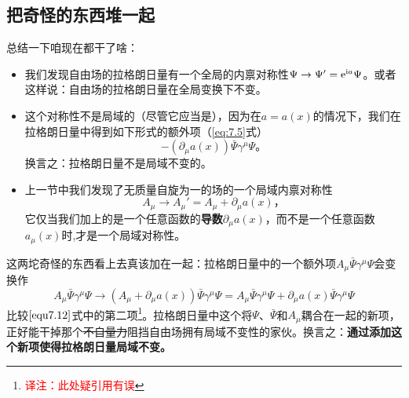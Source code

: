 \subsection{把奇怪的东西堆一起}\label{sec7.1.3}
总结一下咱现在都干了啥：
\begin{itemize}
\item 我们发现\spint 自由场的拉格朗日量有一个全局的内禀对称性$\Psi\rightarrow\Psi' = \mathrm e^{\mathrm i a}\Psi$。或者这样说：\spint 自由场的拉格朗日量在全局\uo 变换下不变。
\item 这个对称性不是局域的（尽管它应当是），因为在$a=a(x)$的情况下，我们在拉格朗日量中得到如下形式的额外项（\ref{eq:7.5}式）
\begin{equation}
-(\partial_\mu a(x))\bar\Psi\gamma^\mu\Psi \text{。}
\label{equ7.12}
\end{equation}
换言之：拉格朗日量不是局域\uo 不变的。
\item 上一节中我们发现了无质量自旋为一的场的一个局域内禀对称性
\begin{equation}
A_\mu \rightarrow A_\mu' = A_\mu +\partial_\mu a(x) \text{，}
\label{equ7.13}
\end{equation}
它仅当我们加上的是一个任意函数的{\bf 导数}$\partial_\mu a(x)$，而不是一个任意函数$a_\mu(x)$时,才是一个局域对称性。
\end{itemize}
这两坨奇怪的东西看上去真该加在一起：拉格朗日量中的一个额外项$A_\mu\bar\Psi\gamma^\mu\Psi$会变换作
\begin{equation}
\label{equ7.14}
A_\mu\bar\Psi\gamma^\mu\Psi \rightarrow (A_\mu+\partial_\mu a(x))\bar\Psi\gamma^\mu\Psi = A_\mu\bar\Psi\gamma^\mu\Psi + \partial_\mu a(x)\bar\Psi\gamma^\mu\Psi
\end{equation}
比较$\ref{equ7.12}$式中的第二项\footnote{\textcolor{red}{译注：此处疑引用有误}}。拉格朗日量中这个将$\Psi$、$\bar\Psi$和$A_\mu$耦合在一起的新项，正好能干掉那个\sout{不自量力}阻挡\spint 自由场拥有局域\uo 不变性的家伙。换言之：{\bf 通过添加这个新项使得拉格朗日量局域\uo 不变。}

